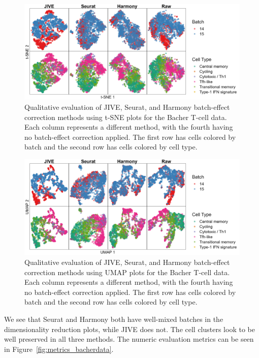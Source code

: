 \documentclass[unnumsec,webpdf,contemporary,large]{oup-authoring-template}%
\theoremstyle{thmstyleone}%
\theoremstyle{thmstyletwo}%
\theoremstyle{thmstylethree}%
\begin{document}
\begin{figure}[ht]
    \centering 
    \includegraphics[width=1\columnwidth]{tsne_bacherdata} 
    \caption[t-SNE Plots for the Bacher T-Cell Data]{Qualitative evaluation of JIVE, Seurat, and Harmony batch-effect correction methods using t-SNE plots for the Bacher T-cell data. Each column represents a different method, with the fourth having no batch-effect correction applied. The first row has cells colored by batch and the second row has cells colored by cell type.}
    \label{fig:tsne_bacherdata}
\end{figure}

\begin{figure}[ht]
    \centering 
    \includegraphics[width=1\columnwidth]{umap_bacherdata} 
    \caption[UMAP Plots for the Bacher T-Cell Data]{Qualitative evaluation of JIVE, Seurat, and Harmony batch-effect correction methods using UMAP plots for the Bacher T-cell data. Each column represents a different method, with the fourth having no batch-effect correction applied. The first row has cells colored by batch and the second row has cells colored by cell type.}
    \label{fig:umap_bacherdata} 
\end{figure}

We see that Seurat and Harmony both have well-mixed batches in the dimensionality reduction plots, while JIVE does not. The cell clusters look to be well preserved in all three methods. The numeric evaluation metrics can be seen in Figure~\ref{fig:metrics_bacherdata}.
\end{document}
